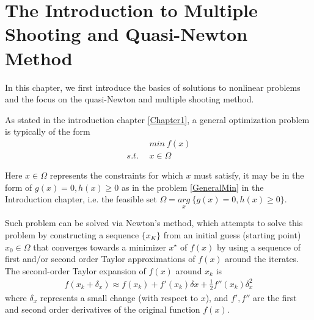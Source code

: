 

\chapter{The Introduction to Multiple Shooting and Quasi-Newton Method}

In this chapter, we first introduce the basics of solutions to nonlinear problems and the focus on the quasi-Newton and multiple shooting method. 

As stated in the introduction chapter \ref{Chapter1}, a general optimization problem is typically of the form 
\begin{equation}
	\begin{aligned}
		\  \  \ & min \  f(x) \\
		s.t.\ \  & x \in \Omega
	\end{aligned}
	\label{GeneralOpt}
\end{equation}

Here $x \in \Omega$ represents the constraints for which $x$ must satisfy, it may be in the form of $ g(x) = 0,  h(x)  \geq  0$ as in the problem \ref{GeneralMin} in the Introduction chapter, i.e. the feasible set $\Omega = \underset{x}{arg} \ \{ g(x) = 0,  h(x)  \geq  0 \}$. 

Such problem can be solved via Newton's method, which attempts to solve this problem by constructing a sequence $\{x_K\}$ from an initial guess (starting point) $x_0 \in \Omega$ that converges towards a minimizer $x^\star$ of $f(x)$  by using a sequence of first and/or second order Taylor approximations of $f(x)$ around the iterates. The second-order Taylor expansion of $f(x)$ around $x_k$ is
\begin{align*}
f(x_k + \delta_x) \approx f(x_k) + f'(x_k)\delta x +\frac{1}{2}f''(x_k)\delta_x^2
\end{align*}
where $\delta_x$ represents a small change (with respect to $x$), and $f', f''$ are the first and second order derivatives of the original function $f(x)$. 






